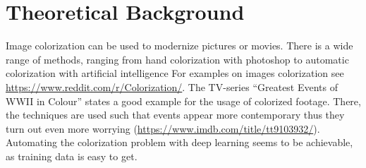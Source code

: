 \documentclass[12pt,letterpaper]{article}
\begin{document}

\section{Theoretical Background}
Image colorization can be used to modernize pictures or movies. There is a wide range of methods, ranging from hand colorization with photoshop to automatic colorization with artificial intelligence For examples on images colorization see \url{https://www.reddit.com/r/Colorization/}. The TV-series \enquote{Greatest Events of WWII in Colour} states a good example for the usage of colorized footage. There, the techniques are used such that events appear more contemporary thus they turn out even more worrying (\url{https://www.imdb.com/title/tt9103932/}). 
Automating the colorization problem with deep learning seems to be achievable, as training data is easy to get.
\end{document}
